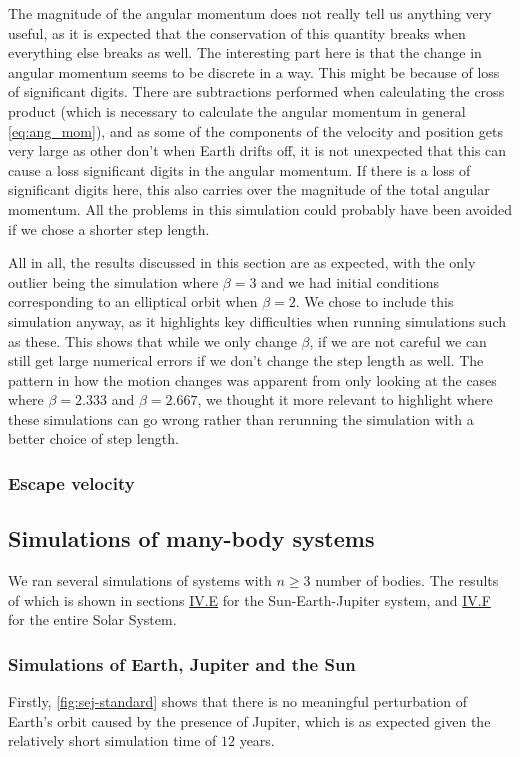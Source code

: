 \documentclass[reprint,english,notitlepage]{revtex4-1}  %
\begin{document}
The magnitude of the angular momentum does not really tell us anything very useful, as it is expected that the conservation of this quantity breaks when everything else breaks as well. The interesting part here is that the change in angular momentum seems to be discrete in a way. This might be because of loss of significant digits. There are subtractions performed when calculating the cross product (which is necessary to calculate the angular momentum in general \eqref{eq:ang_mom}), and as some of the components of the velocity and position gets very large as other don't when Earth drifts off, it is not unexpected that this can cause a loss significant digits in the angular momentum. If there is a loss of significant digits here, this also carries over the magnitude of the total angular momentum. All the problems in this simulation could probably have been avoided if we chose a shorter step length.

All in all, the results discussed in this section are as expected, with the only outlier being the simulation where $\beta = 3$ and we had initial conditions corresponding to an elliptical orbit when $\beta = 2$. We chose to include this simulation anyway, as it highlights key difficulties when running simulations such as these. This shows that while we only change $\beta$, if we are not careful we can still get large numerical errors if we don't change the step length as well. The pattern in how the motion changes was apparent from only looking at the cases where $\beta = 2.333$ and $\beta = 2.667$, we thought it more relevant to highlight where these simulations can go wrong rather than rerunning the simulation with a better choice of step length.

\subsubsection{Escape velocity} \label{sec:V:b:iv}


\subsection{Simulations of many-body systems} \label{sec:V:c}
We ran several simulations of systems with \(n\geq3\) number of bodies. The results of which is shown in sections \hyperref[sec:IV:e]{IV.E} for the Sun-Earth-Jupiter system, and \hyperref[sec:IV:f]{IV.F} for the entire Solar System.

\subsubsection{Simulations of Earth, Jupiter and the Sun} \label{sec:V:c:i}
Firstly, \ref{fig:sej-standard} shows that there is no meaningful perturbation of Earth's orbit caused by the presence of Jupiter, which is as expected given the relatively short simulation time of \(12\) years.
\end{document}
